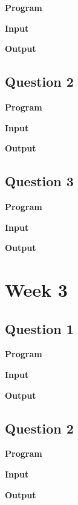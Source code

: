 \documentclass{article}
\begin{document}
\noindent \textbf{\large{Program}}

\newpage
\noindent \textbf{\large{Input}}

\noindent \textbf{\large{Output}}


\newpage
\subsection{Question 2}

\newline

\noindent \textbf{\large{Program}}

\newpage
\noindent \textbf{\large{Input}}

\noindent \textbf{\large{Output}}


\newpage
\subsection{Question 3}

\newline

\noindent \textbf{\large{Program}}

\newpage
\noindent \textbf{\large{Input}}

\noindent \textbf{\large{Output}}

\newpage
\section{Week 3}

\subsection{Question 1}

\newline

\noindent \textbf{\large{Program}}

\newpage
\noindent \textbf{\large{Input}}

\noindent \textbf{\large{Output}}


\newpage
\subsection{Question 2}

\newline

\noindent \textbf{\large{Program}}

\newpage
\noindent \textbf{\large{Input}}

\noindent \textbf{\large{Output}}

\end{document}
